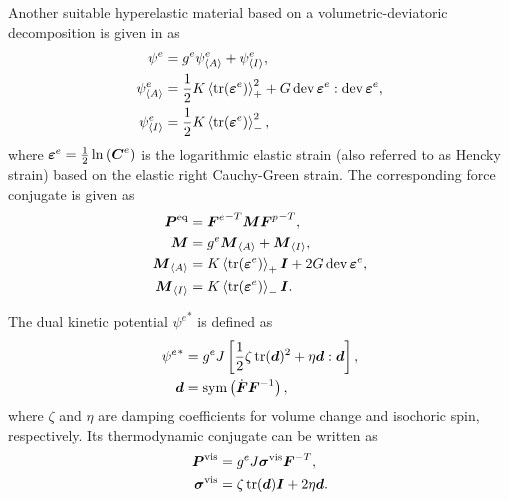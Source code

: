Another suitable hyperelastic material based on a volumetric-deviatoric decomposition is given in \cite{brandon2020cohesive} as
\begin{subequations}
  \begin{align}
    \psi^e               & =  g^e \psi^e_{\left< A \right>} + \psi^e_{\left< I \right>},                                     \\
    \psi^e_{\left< A \right>}   & = \dfrac{1}{2} K \left<\operatorname{tr}(\boldsymbol{\varepsilon}^e)\right>_+^2 + G \operatorname{dev}{\boldsymbol{\varepsilon}^e} : \operatorname{dev}{\boldsymbol{\varepsilon}^e}, \\
    \psi^e_{\left< I \right>} & = \dfrac{1}{2} K \left<\operatorname{tr}(\boldsymbol{\varepsilon}^e)\right>_-^2,
  \end{align}
\end{subequations}
where $\boldsymbol{\varepsilon}^e = \frac{1}{2} \ln\left( \boldsymbol{C}^e \right)$ is the logarithmic elastic strain (also referred to as Hencky strain) based on the elastic right Cauchy-Green strain. The corresponding force conjugate is given as
\begin{align}
  \boldsymbol{P}^\text{eq}     & = {\boldsymbol{F}^e}^{-T} \boldsymbol{M} {\boldsymbol{F}^p}^{-T},                 \\
  \boldsymbol{M}               & = g^e \boldsymbol{M}_{\left< A \right>} + \boldsymbol{M}_{\left< I \right>},                \\
  \boldsymbol{M}_{\left< A \right>}   & = K \left<\operatorname{tr}(\boldsymbol{\varepsilon}^e)\right>_+ \boldsymbol{I} + 2 G \operatorname{dev}{\boldsymbol{\varepsilon}^e}, \\
  \boldsymbol{M}_{\left< I \right>} & = K \left<\operatorname{tr}(\boldsymbol{\varepsilon}^e)\right>_- \boldsymbol{I}.
\end{align}

The dual kinetic potential ${\psi^e}^*$ is defined as
\begin{subequations}
  \begin{align}
    {\psi^e}^* & = g^e J \left[ \dfrac{1}{2}\zeta \operatorname{tr}(\boldsymbol{d})^2 + \eta \boldsymbol{d}:\boldsymbol{d} \right], \\
    \boldsymbol{d}       & = \operatorname{sym}\left( \dot{\boldsymbol{F}}\boldsymbol{F}^{-1} \right),
  \end{align}
\end{subequations}
where $\zeta$ and $\eta$ are damping coefficients for volume change and isochoric spin, respectively. Its thermodynamic conjugate can be written as
\begin{subequations}
  \begin{align}
    \boldsymbol{P}^\text{vis}    & = g^e J \boldsymbol{\sigma}^\text{vis} \boldsymbol{F}^{-T}, \\
    \boldsymbol{\sigma}^\text{vis} & = \zeta \operatorname{tr}(\boldsymbol{d}) \boldsymbol{I} + 2 \eta \boldsymbol{d}.
  \end{align}
\end{subequations}

